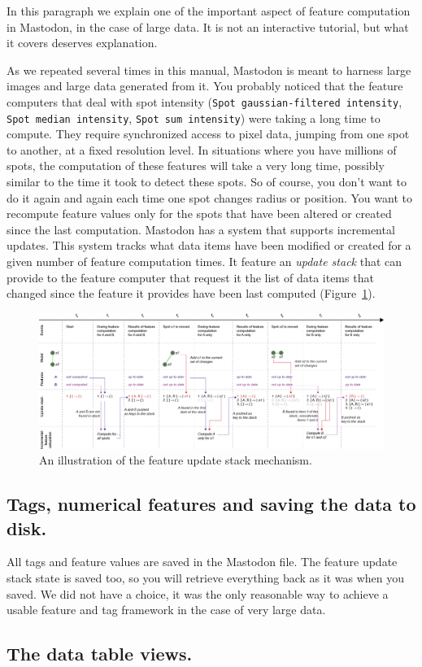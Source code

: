 In this paragraph we explain one of the important aspect of feature computation in Mastodon, in the case of large data.
It is not an interactive tutorial, but what it covers deserves explanation. 

As we repeated several times in this manual, Mastodon is meant to harness large images and large data generated from it. 
You probably noticed that the feature computers that deal with spot intensity (\texttt{Spot gaussian-filtered intensity}, \texttt{Spot median intensity}, \texttt{Spot sum intensity}) were taking a long time to compute. 
They require synchronized access to pixel data, jumping from one spot to another, at a fixed resolution level.
In situations where you have millions of spots, the computation of these features will take a very long time, possibly similar to the time it took to detect these spots. 
So of course, you don't want to do it again and again each time one spot changes radius or position.
You want to recompute feature values only for the spots that have been altered or created since the last computation. 
Mastodon has a system that supports incremental updates. 
This system tracks what data items have been modified or created for a given number of feature computation times. 
It feature an \textit{update stack} that can provide to the feature computer that request it the list of data items that changed since the feature it provides have been last computed (Figure~\ref{fig:FeatureUpdateStack}). 

\begin{figure}
    \centering
    \includegraphics[angle=90, height=0.8\textheight]{figures/Mastodon_FeatureUpdateStack.png}
    \caption{An illustration of the feature update stack mechanism.  }
    \label{fig:FeatureUpdateStack}
\end{figure}


\subsection{Tags, numerical features and saving the data to disk.}

All tags and feature values are saved in the Mastodon file. 
The feature update stack state is saved too, so you will retrieve everything back as it was when you saved.
We did not have a choice, it was the only reasonable way to achieve a usable feature and tag framework in the case of very large data.

\subsection{The data table views.}


